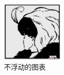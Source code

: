 \documentclass[nofonts]{ctexart}
\begin{document}
\begin{figure}[H]
	\centering
	\includegraphics[height=3cm]{lady.jpg}
	\caption{不浮动的图表}
\end{figure}
\end{document}
